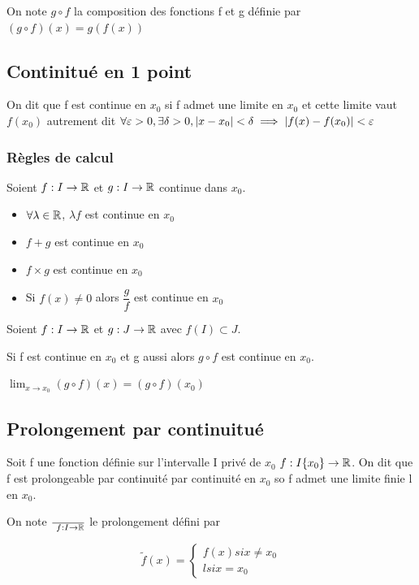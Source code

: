\documentclass[a4paper, 12pt]{article}
\begin{document}
\begin{proprietes}
    On note $g \circ f$ la composition des fonctions f et g définie par $(g \circ f)(x) = g(f(x))$
\end{proprietes}

\subsection{Continitué en 1 point}

\begin{definition}
    On dit que f est continue en $x_0$ si f admet une limite en $x_0$ et cette limite vaut $f(x_0)$ autrement dit $\forall \varepsilon > 0, \exists \delta > 0, |x - x_0| < \delta \implies |f(x) - f(x_0)| < \varepsilon$
\end{definition}

\subsubsection{Règles de calcul}

Soient $f: I \to \mathbb{R}$ et $g: I \to \mathbb{R}$ continue dans $x_0$.

\begin{itemize}
    \item $\forall \lambda \in \mathbb{R}$, $\lambda f$ est continue en $x_0$
    \item $f + g$ est continue en $x_0$
    \item $f \times g$ est continue en $x_0$
    \item Si $f(x) \neq 0$ alors $\dfrac{g}{f}$ est continue en $x_0$
\end{itemize}

\begin{proposition}
    Soient $f: I \to \mathbb{R}$ et $g: J \to \mathbb{R}$ avec $f(I) \subset J$.

    Si f est continue en $x_0$ et g aussi alors $g \circ f$ est continue en $x_0$.

    $\lim_{x \to x_0}(g \circ f)(x) = (g \circ f)(x_0)$
\end{proposition}

\subsection{Prolongement par continuitué}

\begin{definition}
    Soit f une fonction définie sur l'intervalle I privé de $x_0$
    $f: I\\\{x_0\} \rightarrow \mathbb{R}$. On dit que f est prolongeable par continuité par
    continuité en $x_0$ so f admet une limite finie l en $x_0$.

    On note $\over{~}f: I \rightarrow \mathbb{R}$ le prolongement défini par

    $$
    \tilde{f} (x) =
    \begin{cases}
        f(x) si x \neq x_0 \\
        l si x = x_0
    \end{cases}
    $$
\end{definition}
\end{document}
